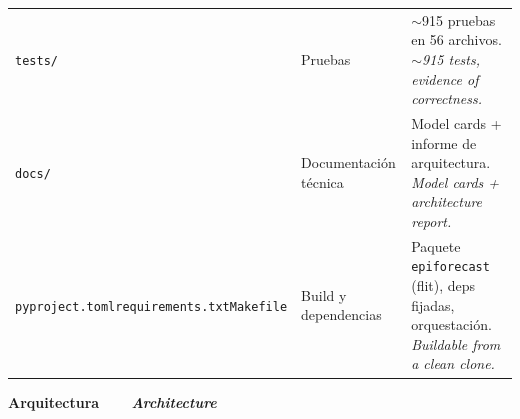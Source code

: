 \documentclass[10pt]{article}
\newcommand{\msec}[2]{\vspace{8pt}\par
  {\hf\bfseries\large\color{indigo}#1\ \ \textcolor{accent}{\textbar}\ \ {\itshape\mdseries\color{soft}#2}}\par
  \vspace{1pt}{\color{accent}\hrule height 1.3pt}\vspace{5pt}}
\begin{document}
{\begin{longtable}{>{\raggedright\arraybackslash}p{2.95cm} >{\raggedright\arraybackslash}p{3.3cm} >{\raggedright\arraybackslash}p{9.7cm}}
\texttt{tests/} & Pruebas & $\sim$915 pruebas en 56 archivos. \textit{$\sim$915 tests, evidence of correctness.}\\
\texttt{docs/} & Documentación técnica & Model cards + informe de arquitectura. \textit{Model cards + architecture report.}\\
\texttt{pyproject.toml}\newline\texttt{requirements.txt}\newline\texttt{Makefile} & Build y dependencias & Paquete \texttt{epiforecast} (flit), deps fijadas, orquestación. \textit{Buildable from a clean clone.}\\
\end{longtable}}

\newpage
\msec{Arquitectura}{Architecture}
\end{document}
